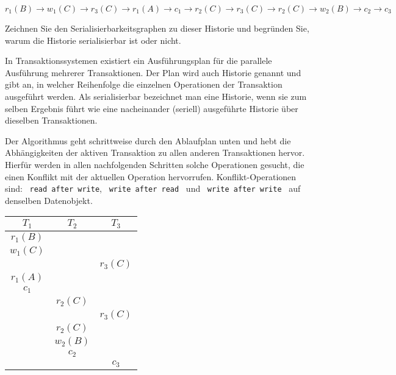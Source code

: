 \documentclass{bschlangaul-aufgabe}
\begin{document}
\begin{enumerate}
\bigskip

$
r_1 (B) \rightarrow
w_1 (C) \rightarrow
r_3 (C) \rightarrow
r_1 (A) \rightarrow
c_1 \rightarrow
r_2 (C) \rightarrow
r_3 (C) \rightarrow
r_2 (C) \rightarrow
w_2 (B) \rightarrow
c_2 \rightarrow
c_3
$

\bigskip

Zeichnen Sie den
Serialisierbarkeitsgraphen zu dieser
Historie und begründen Sie, warum die Historie serialisierbar ist oder
nicht.

\begin{bExkurs}[Historie]
In Transaktionssystemen existiert ein Ausführungsplan für die parallele
Ausführung mehrerer Transaktionen. Der Plan wird auch Historie genannt
und gibt an, in welcher Reihenfolge die einzelnen Operationen der
Transaktion ausgeführt werden. Als serialisierbar bezeichnet man eine
Historie, wenn sie zum selben Ergebnis führt wie eine nacheinander
(seriell) ausgeführte Historie über dieselben Transaktionen.
\end{bExkurs}

\begin{bAntwort}
Der Algorithmus geht schrittweise durch den Ablaufplan unten und hebt
die Abhängigkeiten der aktiven Transaktion zu allen anderen
Transaktionen hervor. Hierfür werden in allen nachfolgenden Schritten
solche Operationen gesucht, die einen Konﬂikt mit der aktuellen
Operation hervorrufen. Konﬂikt-Operationen sind: \,  \texttt{read after
write}, \, \texttt{write after read} \,  und \,  \texttt{write after
write} \, auf denselben Datenobjekt.

\begin{center}
\begin{tabular}{|c|c|c|}
\hline
$T_1$     & $T_2$     & $T_3$     \\\hline\hline
$r_1 (B)$ &           &           \\\hline
$w_1 (C)$ &           &           \\\hline
          &           & $r_3 (C)$ \\\hline
$r_1 (A)$ &           &           \\\hline
$c_1$     &           &           \\\hline
          & $r_2 (C)$ &           \\\hline
          &           & $r_3 (C)$ \\\hline
          & $r_2 (C)$ &           \\\hline
          & $w_2 (B)$ &           \\\hline
          & $c_2$     &           \\\hline
          &           & $c_3$     \\\hline
\end{tabular}
\end{center}


\end{bAntwort}
\end{enumerate}
\end{document}
